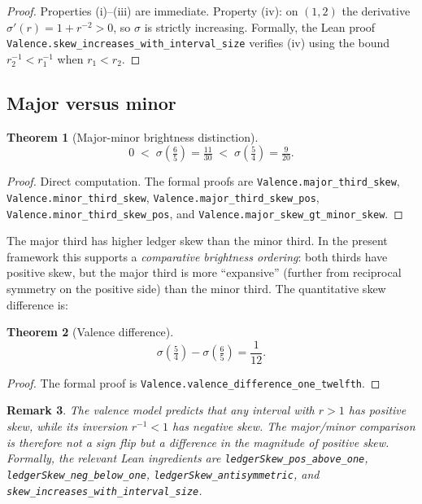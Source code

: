 \documentclass[11pt,a4paper]{article}
\newtheorem{theorem}{Theorem}
\newtheorem{remark}[theorem]{Remark}
\begin{document}
\begin{proof}
Properties (i)--(iii) are immediate.  Property (iv): on $(1,2)$ the
derivative $\sigma'(r)=1+r^{-2}>0$, so $\sigma$ is strictly increasing.
Formally, the Lean proof
\texttt{Valence.skew\_increases\_with\_interval\_size} verifies (iv)
using the bound $r_2^{-1}<r_1^{-1}$ when $r_1<r_2$.
\end{proof}

\subsection{Major versus minor}

\begin{theorem}[Major-minor brightness distinction]
\label{thm:major-minor}
\[
  0
  \;<\;
  \sigma\!\left(\tfrac{6}{5}\right)=\tfrac{11}{30}
  \;<\;
  \sigma\!\left(\tfrac{5}{4}\right)=\tfrac{9}{20}.
\]
\end{theorem}

\begin{proof}
Direct computation.  The formal proofs are
\texttt{Valence.major\_third\_skew}, \texttt{Valence.minor\_third\_skew},
\texttt{Valence.major\_third\_skew\_pos},
\texttt{Valence.minor\_third\_skew\_pos}, and
\texttt{Valence.major\_skew\_gt\_minor\_skew}.
\end{proof}

\noindent The major third has higher ledger skew than the minor third.
In the present framework this supports a \emph{comparative brightness
ordering}: both thirds have positive skew, but the major third is more
``expansive'' (further from reciprocal symmetry on the positive side)
than the minor third.  The quantitative skew difference is:

\begin{theorem}[Valence difference]
\label{thm:val-diff}
\[
  \sigma\!\left(\tfrac{5}{4}\right) - \sigma\!\left(\tfrac{6}{5}\right)
  = \frac{1}{12}.
\]
\end{theorem}

\begin{proof}
The formal proof is
\texttt{Valence.valence\_difference\_one\_twelfth}.
\end{proof}

\begin{remark}
The valence model predicts that any interval with $r>1$ has positive
skew, while its inversion $r^{-1}<1$ has negative skew.  The major/minor
comparison is therefore not a sign flip but a difference in the
magnitude of positive skew.  Formally, the relevant Lean ingredients are
\texttt{ledgerSkew\_pos\_above\_one},
\texttt{ledgerSkew\_neg\_below\_one},
\texttt{ledgerSkew\_antisymmetric}, and
\texttt{skew\_increases\_with\_interval\_size}.
\end{remark}
\end{document}
